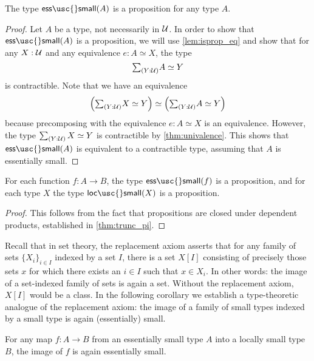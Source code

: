 \begin{lem}\label{lem:isprop_ess_small}
The type $\mathsf{ess\usc{}small}(A)$ is a proposition for any type $A$.
\end{lem}

\begin{proof}
Let $A$ be a type, not necessarily in $\mathcal{U}$. In order to show that $\mathsf{ess\usc{}small}(A)$ is a proposition, we will use \cref{lem:isprop_eq} and show that for any $X:\mathcal{U}$ and any equivalence $e:A\simeq X$, the type
\begin{equation*}
\sm{Y:\UU}\eqv{A}{Y}
\end{equation*}
is contractible. Note that we have an equivalence
\begin{equation*}
\eqv{\Big(\sm{Y:\UU}\eqv{X}{Y}\Big)}{\Big(\sm{Y:\UU}\eqv{A}{Y}\Big)}
\end{equation*}
because precomposing with the equivalence $e:A \simeq X$ is an equivalence. However, the type $\sm{Y:\UU}\eqv{X}{Y}$ is contractible by \cref{thm:univalence}. This shows that $\mathsf{ess\usc{}small}(A)$ is equivalent to a contractible type, assuming that $A$ is essentially small.
\end{proof}

\begin{cor}
For each function $f:A\to B$, the type $\mathsf{ess\usc{}small}(f)$ is a proposition, and for each type $X$ the type $\mathsf{loc\usc{}small}(X)$ is a proposition.
\end{cor}

\begin{proof}
This follows from the fact that propositions are closed under dependent products, established in \cref{thm:trunc_pi}.
\end{proof}

Recall that in set theory, the replacement axiom asserts that for any family of sets $\{X_i\}_{i\in I}$ indexed by a set $I$, there is a set $X[I]$ consisting of precisely those sets $x$ for which there exists an $i\in I$ such that $x\in X_i$. In other words: the image of a set-indexed family of sets is again a set. Without the replacement axiom, $X[I]$ would be a class. In the following corollary we establish a type-theoretic analogue of the replacement axiom: the image of a family of small types indexed by a small type is again (essentially) small.

\begin{axiom}\label{axiom:replacement}
  For any map $f:A\to B$ from an essentially small type $A$ into a locally small type $B$, the image of $f$ is again essentially small.
\end{axiom}

